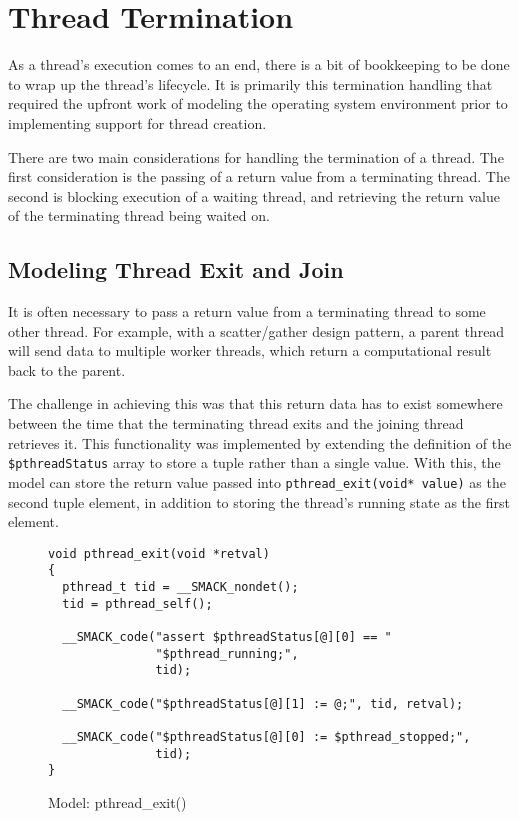 \section{Thread Termination}
As a thread's execution comes to an end, there is a bit of bookkeeping
to be done to wrap up the thread's lifecycle.  It is primarily this
termination handling that required the upfront work of modeling the
operating system environment prior to implementing support for thread
creation.

There are two main considerations for handling the termination of a
thread.  The first consideration is the passing of a return value from
a terminating thread.  The second is blocking execution of a waiting
thread, and retrieving the return value of the terminating thread
being waited on.

\subsection{Modeling Thread Exit and Join}
It is often necessary to pass a return value from a terminating thread
to some other thread.  For example, with a scatter/gather design
pattern, a parent thread will send data to multiple worker threads,
which return a computational result back to the parent.

The challenge in achieving this was that this return data has to
exist somewhere between the time that the terminating thread exits
and the joining thread retrieves it.  This functionality was
implemented by extending the definition of the
\lstinline|$pthreadStatus| array to store a tuple rather than a 
single value.  With this, the model can store the return value passed
into \lstinline|pthread_exit(void* value)| as the second tuple 
element, in addition to storing the thread's running state as the
first element.

\begin{figure}[!ht]
\centering
\begin{lstlisting}
void pthread_exit(void *retval)
{
  pthread_t tid = __SMACK_nondet();
  tid = pthread_self();

  __SMACK_code("assert $pthreadStatus[@][0] == "
               "$pthread_running;",
               tid);

  __SMACK_code("$pthreadStatus[@][1] := @;", tid, retval);

  __SMACK_code("$pthreadStatus[@][0] := $pthread_stopped;",
               tid);
}
\end{lstlisting}
\caption{Model: pthread\_exit()}\label{fig:pthread_exit}
\end{figure}


